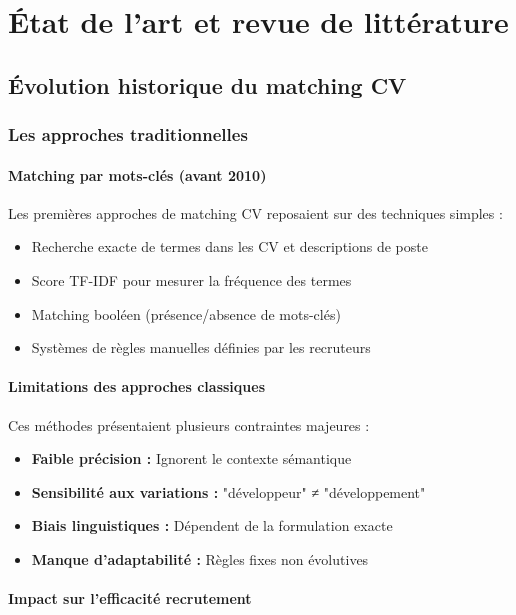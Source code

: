\documentclass[12pt,a4paper]{report}
\begin{document}
\chapter{État de l'art et revue de littérature}
\label{chap:etat-art}

\section{Évolution historique du matching CV}

\subsection{Les approches traditionnelles}

\subsubsection{Matching par mots-clés (avant 2010)}

Les premières approches de matching CV reposaient sur des techniques simples :
\begin{itemize}
\item Recherche exacte de termes dans les CV et descriptions de poste
\item Score TF-IDF pour mesurer la fréquence des termes
\item Matching booléen (présence/absence de mots-clés)
\item Systèmes de règles manuelles définies par les recruteurs
\end{itemize}

\subsubsection{Limitations des approches classiques}

Ces méthodes présentaient plusieurs contraintes majeures :
\begin{itemize}
\item \textbf{Faible précision :} Ignorent le contexte sémantique
\item \textbf{Sensibilité aux variations :} "développeur" ≠ "développement"
\item \textbf{Biais linguistiques :} Dépendent de la formulation exacte
\item \textbf{Manque d'adaptabilité :} Règles fixes non évolutives
\end{itemize}

\subsubsection{Impact sur l'efficacité recrutement}
\end{document}
